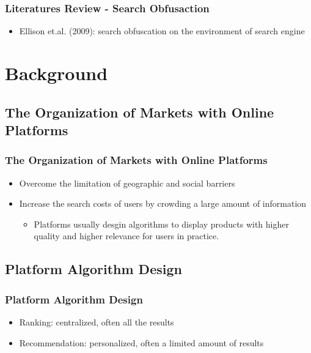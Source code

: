 \documentclass{beamer}
\begin{document}
\begin{frame}
\frametitle{Literatures Review - Search Obfusaction}
\begin{itemize}
\item Ellison et.al. (2009): search obfuscation on the environment of search engine
\end{itemize}
\end{frame}



\section{Background}
\subsection{The Organization of Markets with Online Platforms}
\begin{frame}
\frametitle{The Organization of Markets with Online Platforms}
\begin{itemize}
  \item Overcome the limitation of geographic and social barriers
  \item Increase the search costs of users by crowding a large amount of information
  \begin{itemize}
    \item Platforms usually desgin algorithms to display products with higher quality and higher relevance for users in practice.
  \end{itemize}
\end{itemize}
\end{frame}

\subsection{Platform Algorithm Design}
\begin{frame}
\frametitle{Platform Algorithm Design}
\begin{itemize}
 \item Ranking: centralized, often all the results
 \item Recommendation: personalized, often a limited amount of results
\end{itemize}
\end{frame}
\end{document}
